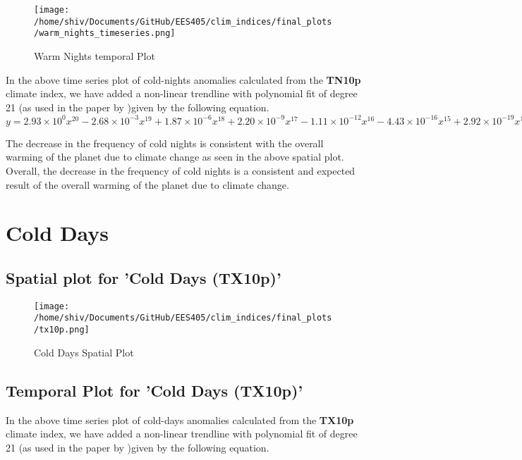 \documentclass[a4paper, 12pt, twoside]{report}
\begin{document}
\begin{figure}[htb]
    \centering
    \texttt{[image: /home/shiv/Documents/GitHub/EES405/clim\_indices/final\_plots/warm\_nights\_timeseries.png]}
    \caption{Warm Nights temporal Plot}
    \label{fig:warm_nights_temporal}
\end{figure}

In the above time series plot of cold-nights anomalies calculated from the \textbf{TN10p} climate index, we have added a non-linear trendline with polynomial fit of degree 21 (as used in the paper by )given by the following equation. \\

$y = 2.93\times10^{0} x^{20} -2.68\times10^{-3} x^{19} +1.87\times10^{-6} x^{18} +2.20\times10^{-9} x^{17} -1.11\times10^{-12} x^{16} -4.43\times10^{-16} x^{15} +2.92\times10^{-19} x^{14} -1.05\times10^{-24} x^{13} -2.91\times10^{-26} x^{12} +6.97\times10^{-30} x^{11} +2.79\times10^{-35} x^{10} -3.35\times10^{-37} x^{9} +8.48\times10^{-41} x^{8} -1.20\times10^{-44} x^{7} +1.14\times10^{-48} x^{6} -7.67\times10^{-53} x^{5} +3.67\times10^{-57} x^{4} -1.24\times10^{-61} x^{3} +2.79\times10^{-66} x^{2} -3.78\times10^{-71} x^{1} +2.34\times10^{-76}$

The decrease in the frequency of cold nights is consistent with the overall warming of the planet due to climate change as seen in the above spatial plot.\\
Overall, the decrease in the frequency of cold nights is a consistent and expected result of the overall warming of the planet due to climate change.

\section{Cold Days}


\subsection{Spatial plot for 'Cold Days (TX10p)'}
\begin{figure}[htb]
    \centering
    \texttt{[image: /home/shiv/Documents/GitHub/EES405/clim\_indices/final\_plots/tx10p.png]}
    \caption{Cold Days Spatial Plot}
    \label{fig:cold_days_spatial}
\end{figure}

\subsection{Temporal Plot for 'Cold Days (TX10p)'}
In the above time series plot of cold-days anomalies calculated from the \textbf{TX10p} climate index, we have added a non-linear trendline with polynomial fit of degree 21 (as used in the paper by )given by the following equation. \\
\end{document}
